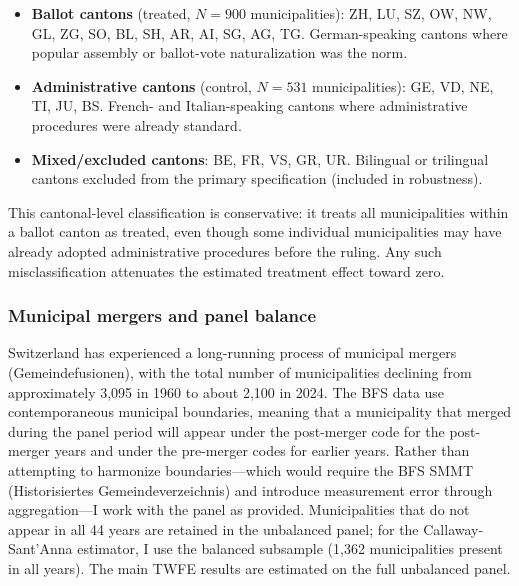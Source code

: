 \documentclass[12pt]{article}
\begin{document}
\begin{itemize}
\item \textbf{Ballot cantons} (treated, $N = 900$ municipalities): ZH, LU, SZ, OW, NW, GL, ZG, SO, BL, SH, AR, AI, SG, AG, TG. German-speaking cantons where popular assembly or ballot-vote naturalization was the norm.
\item \textbf{Administrative cantons} (control, $N = 531$ municipalities): GE, VD, NE, TI, JU, BS. French- and Italian-speaking cantons where administrative procedures were already standard.
\item \textbf{Mixed/excluded cantons}: BE, FR, VS, GR, UR. Bilingual or trilingual cantons excluded from the primary specification (included in robustness).
\end{itemize}

This cantonal-level classification is conservative: it treats all municipalities within a ballot canton as treated, even though some individual municipalities may have already adopted administrative procedures before the ruling. Any such misclassification attenuates the estimated treatment effect toward zero.

\subsubsection*{Municipal mergers and panel balance} Switzerland has experienced a long-running process of municipal mergers (Gemeindefusionen), with the total number of municipalities declining from approximately 3,095 in 1960 to about 2,100 in 2024. The BFS data use contemporaneous municipal boundaries, meaning that a municipality that merged during the panel period will appear under the post-merger code for the post-merger years and under the pre-merger codes for earlier years. Rather than attempting to harmonize boundaries---which would require the BFS SMMT (Historisiertes Gemeindeverzeichnis) and introduce measurement error through aggregation---I work with the panel as provided. Municipalities that do not appear in all 44 years are retained in the unbalanced panel; for the Callaway-Sant'Anna estimator, I use the balanced subsample (1,362 municipalities present in all years). The main TWFE results are estimated on the full unbalanced panel.
\end{document}
